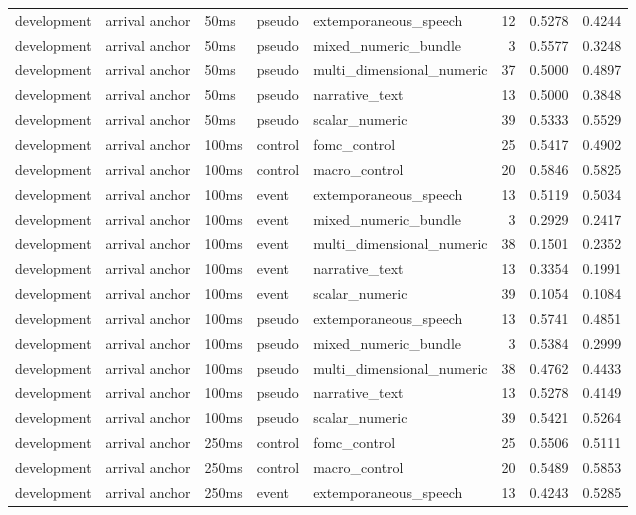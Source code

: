 \begin{tabular}{lllllrrr}
development & arrival anchor & 50ms & pseudo & extemporaneous_speech & 12 & 0.5278 & 0.4244 \\
development & arrival anchor & 50ms & pseudo & mixed_numeric_bundle & 3 & 0.5577 & 0.3248 \\
development & arrival anchor & 50ms & pseudo & multi_dimensional_numeric & 37 & 0.5000 & 0.4897 \\
development & arrival anchor & 50ms & pseudo & narrative_text & 13 & 0.5000 & 0.3848 \\
development & arrival anchor & 50ms & pseudo & scalar_numeric & 39 & 0.5333 & 0.5529 \\
development & arrival anchor & 100ms & control & fomc_control & 25 & 0.5417 & 0.4902 \\
development & arrival anchor & 100ms & control & macro_control & 20 & 0.5846 & 0.5825 \\
development & arrival anchor & 100ms & event & extemporaneous_speech & 13 & 0.5119 & 0.5034 \\
development & arrival anchor & 100ms & event & mixed_numeric_bundle & 3 & 0.2929 & 0.2417 \\
development & arrival anchor & 100ms & event & multi_dimensional_numeric & 38 & 0.1501 & 0.2352 \\
development & arrival anchor & 100ms & event & narrative_text & 13 & 0.3354 & 0.1991 \\
development & arrival anchor & 100ms & event & scalar_numeric & 39 & 0.1054 & 0.1084 \\
development & arrival anchor & 100ms & pseudo & extemporaneous_speech & 13 & 0.5741 & 0.4851 \\
development & arrival anchor & 100ms & pseudo & mixed_numeric_bundle & 3 & 0.5384 & 0.2999 \\
development & arrival anchor & 100ms & pseudo & multi_dimensional_numeric & 38 & 0.4762 & 0.4433 \\
development & arrival anchor & 100ms & pseudo & narrative_text & 13 & 0.5278 & 0.4149 \\
development & arrival anchor & 100ms & pseudo & scalar_numeric & 39 & 0.5421 & 0.5264 \\
development & arrival anchor & 250ms & control & fomc_control & 25 & 0.5506 & 0.5111 \\
development & arrival anchor & 250ms & control & macro_control & 20 & 0.5489 & 0.5853 \\
development & arrival anchor & 250ms & event & extemporaneous_speech & 13 & 0.4243 & 0.5285 \\

\end{tabular}
